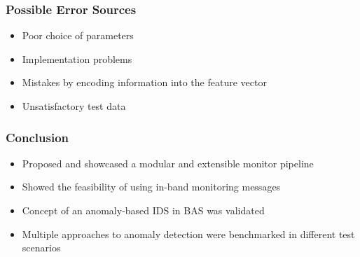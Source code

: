 \begin{frame}[c]
	\frametitle{Possible Error Sources}
	
	\begin{itemize}
		\item Poor choice of parameters
		\item Implementation problems
		\item Mistakes by encoding information into the feature vector
		\item Unsatisfactory test data
	\end{itemize}

\end{frame}

\begin{frame}[c]
	\frametitle{Conclusion}
	
	\begin{itemize}
		\item Proposed and showcased a modular and extensible monitor pipeline
		\item Showed the feasibility of using in-band monitoring messages
		\item Concept of an anomaly-based IDS in BAS was validated
		\item Multiple approaches to anomaly detection were benchmarked in different test scenarios
	\end{itemize}

\end{frame}



\begin{comment}
\begin{frame}[c]
	\frametitle{Motivation}
	\textit{\enquote{4 out of 10 ICS security practitioners lack visibility or sufficient supporting intelligence into their ICS networks}}
	
	\hspace{60mm} --- \textcite{Gregory-Brown2017}
\end{frame}
\end{comment}
